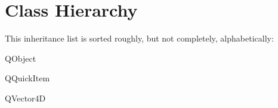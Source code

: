 \section{Class Hierarchy}
This inheritance list is sorted roughly, but not completely, alphabetically\+:\begin{DoxyCompactList}
\item {}
\begin{DoxyCompactList}
\item {}
\item {}
\end{DoxyCompactList}
\item {}
\item Q\+Object\begin{DoxyCompactList}
\item {}
\end{DoxyCompactList}
\item Q\+Quick\+Item\begin{DoxyCompactList}
\item {}
\begin{DoxyCompactList}
\item {}
\end{DoxyCompactList}
\end{DoxyCompactList}
\item Q\+Vector4D\begin{DoxyCompactList}
\item {}
\end{DoxyCompactList}
\item {}
\end{DoxyCompactList}
